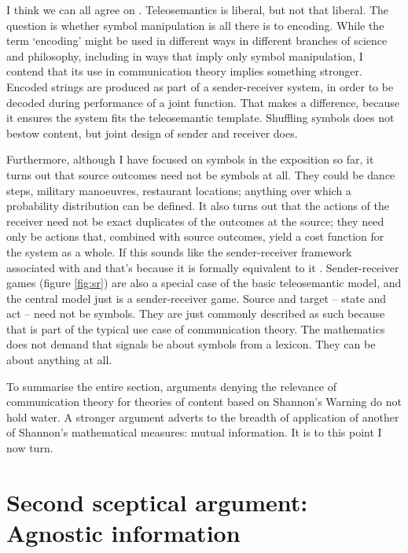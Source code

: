 \documentclass[12pt]{article}
\begin{document}
\noindent I think we can all agree on \smi{}.
Teleosemantics is liberal, but not that liberal.
The question is whether symbol manipulation is all there is to encoding.
While the term `encoding' might be used in different ways in different branches of science and philosophy, including in ways that imply only symbol manipulation, I contend that its use in communication theory implies something stronger.
Encoded strings are produced as part of a sender-receiver system, in order to be decoded during performance of a joint function.
That makes a difference, because it ensures the system fits the teleosemantic template.
Shuffling symbols does not bestow content, but joint design of sender and receiver does.

Furthermore, although I have focused on symbols in the exposition so far, it turns out that source outcomes need not be symbols at all.
They could be dance steps, military manoeuvres, restaurant locations; anything over which a probability distribution can be defined.
It also turns out that the actions of the receiver need not be exact duplicates of the outcomes at the source; they need only be actions that, combined with source outcomes, yield a cost function for the system as a whole.
If this sounds like the sender-receiver framework associated with \citet{skyrms2010signals} and \citet{lewis1969convention} that's because it is formally equivalent to it \citep{martinez2019deception}.
Sender-receiver games (figure \ref{fig:sr}) are also a special case of the basic teleosemantic model, and the central model just is a sender-receiver game.
Source and target -- state and act -- need not be symbols.
They are just commonly described as such because that is part of the typical use case of communication theory.
The mathematics does not demand that signals be about symbols from a lexicon.
They can be about anything at all.



To summarise the entire section, arguments denying the relevance of communication theory for theories of content based on {\sc Shannon's Warning} do not hold water.
A stronger argument adverts to the breadth of application of another of Shannon's mathematical measures: mutual information.
It is to this point I now turn.


\section{Second sceptical argument: Agnostic information}\label{sec:agnostic}
\end{document}
